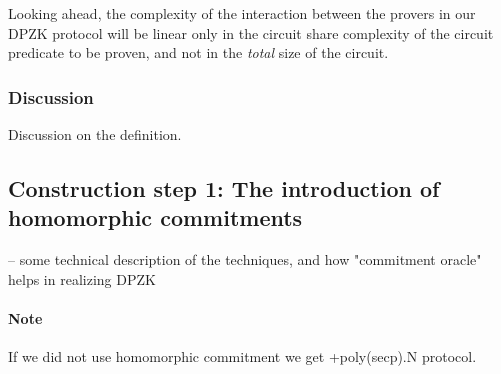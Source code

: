 Looking ahead, the complexity of the interaction between the provers in our DPZK protocol will be linear only in the circuit share complexity of the circuit predicate to be proven, and not in the \textit{total} size of the circuit. 
 
\subsubsection{Discussion}
Discussion on the definition.

\subsection{Construction step 1: The introduction of homomorphic commitments}

 -- some technical description of the techniques, and how "commitment oracle"
helps in realizing DPZK

\paragraph{Note} If we did not use homomorphic commitment we get +poly(secp).N protocol.
